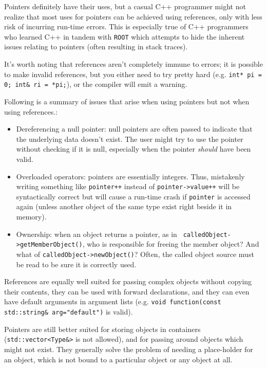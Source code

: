 \documentclass[10pt,a4paper]{book}
\newcommand{\ROOT}{\Verb`ROOT` }
\begin{document}
Pointers definitely have their uses, but a casual C++ programmer might not realize that most uses for pointers can be achieved using references, only with less risk of incurring run-time errors. This is especially true of C++ programmers who learned C++ in tandem with \ROOT which attempts to hide the inherent issues relating to pointers (often resulting in stack traces).

It's worth noting that references aren't completely immune to errors; it is possible to make invalid references, but you either need to try pretty hard (e.g. \Verb`int* pi = 0; int& ri = *pi;`), or the compiler will emit a warning.

Following is a summary of issues that arise when using pointers but not when using references.:

\begin{itemize}
	\item Dereferencing a null pointer: null pointers are often passed to indicate that the underlying data doesn't exist. The user might try to use the pointer without checking if it is null, especially when the pointer \emph{should} have been valid.
	\item Overloaded operators: pointers are essentially integers. Thus, mistakenly writing something like \Verb`pointer++` instead of \Verb`pointer->value++` will be syntactically correct but will cause a run-time crash if \Verb`pointer` is accessed again (unless another object of the same type exist right beside it in memory).
	\item Ownership: when an object returns a pointer, as in \Verb` calledObject->getMemberObject()`, who is responsible for freeing the member object? And what of \Verb`calledObject->newObject()`? Often, the called object source must be read to be sure it is correctly used.
\end{itemize}

References are equally well suited for passing complex objects without copying their contents, they can be used with forward declarations, and they can even have default arguments in argument lists (e.g. \Verb`void function(const std::string& arg="default")` is valid).

Pointers are still better suited for storing objects in containers (\Verb`std::vector<Type&>` is not allowed), and for passing around objects which might not exist. They generally solve the problem of needing a place-holder for an object, which is not bound to a particular object or any object at all.
\end{document}

